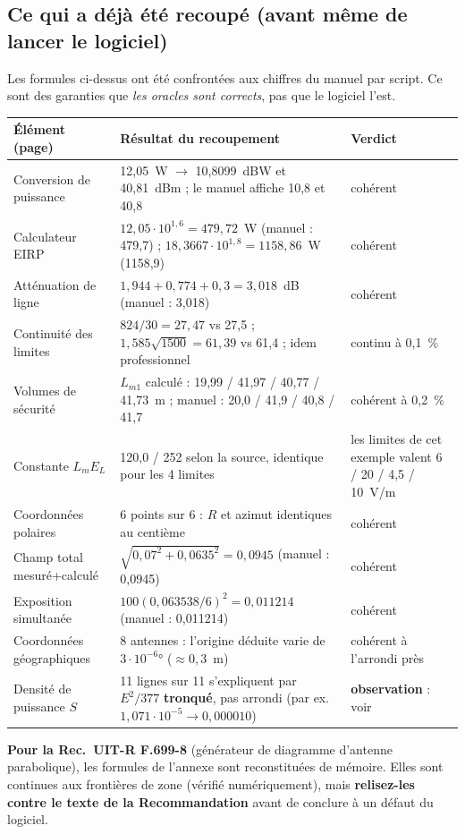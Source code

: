 \subsection{Ce qui a déjà été recoupé (avant même de lancer le logiciel)}
Les formules ci-dessus ont été confrontées aux chiffres du manuel par script. Ce sont des garanties que \emph{les oracles sont corrects}, pas que le logiciel l'est.
\begin{center}\small\renewcommand{\arraystretch}{1.15}
\begin{tabular}{@{}Y{4.6cm}Y{7.4cm}Y{3.9cm}@{}}\toprule
\textbf{Élément (page)} & \textbf{Résultat du recoupement} & \textbf{Verdict}\\\midrule
Conversion de puissance & 12,05~W $\to$ 10,8099~dBW et 40,81~dBm ; le manuel affiche 10,8 et 40,8 & cohérent\\
Calculateur EIRP & $12{,}05\cdot10^{1{,}6}=479{,}72$~W (manuel : 479,7) ; $18{,}3667\cdot10^{1{,}8}=1158{,}86$~W (1158,9) & cohérent\\
Atténuation de ligne & $1{,}944+0{,}774+0{,}3=3{,}018$~dB (manuel : 3,018) & cohérent\\
Continuité des limites & $824/30=27{,}47$ vs 27,5 ; $1{,}585\sqrt{1500}=61{,}39$ vs 61,4 ; idem professionnel & continu à 0,1~\%\\
Volumes de sécurité & $L_{m1}$ calculé : 19,99 / 41,97 / 40,77 / 41,73~m ; manuel : 20,0 / 41,9 / 40,8 / 41,7 & cohérent à 0,2~\%\\
Constante $L_mE_L$ & 120,0 / 252 selon la source, identique pour les 4 limites & les limites de cet exemple valent 6 / 20 / 4,5 / 10~V/m\\
Coordonnées polaires & 6 points sur 6 : $R$ et azimut identiques au centième & cohérent\\
Champ total mesuré+calculé & $\sqrt{0{,}07^2+0{,}0635^2}=0{,}0945$ (manuel : 0,0945) & cohérent\\
Exposition simultanée & $100(0{,}063538/6)^2=0{,}011214$ (manuel : 0,011214) & cohérent\\
Coordonnées géographiques & 8 antennes : l'origine déduite varie de $3\cdot10^{-6}$° ($\approx0{,}3$~m) & cohérent à l'arrondi près\\
Densité de puissance $S$ & 11 lignes sur 11 s'expliquent par $E^2/377$ \textbf{tronqué}, pas arrondi (par ex. $1{,}071\cdot10^{-5}\to0{,}000010$) & \textbf{observation} : voir \\\bottomrule
\end{tabular}\end{center}
\begin{note}\textbf{Pour la Rec.\ UIT-R F.699-8} (générateur de diagramme d'antenne parabolique), les formules de l'annexe sont reconstituées de mémoire. Elles sont continues aux frontières de zone (vérifié numériquement), mais \textbf{relisez-les contre le texte de la Recommandation} avant de conclure à un défaut du logiciel.\end{note}
